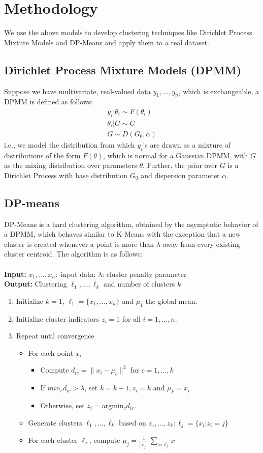 \documentclass{article} %
\begin{document}
\section{Methodology}
We use the above models to develop clustering techniques like Dirichlet Process Mixture Models and DP-Means and apply them to a real dataset.
\subsection{Dirichlet Process Mixture Models (DPMM)}
Suppose we have multivariate, real-valued data $y_1,...,y_n$, which is exchangeable, a DPMM is defined as follows:
\begin{eqnarray*}
y_i|\theta_i \sim F(\theta_i)\\
\theta_i|G \sim G\\
G \sim D(G_0, \alpha)
\end{eqnarray*}
i.e., we model the distribution from which $y_i$'s are drawn as a mixture of distributions of the form $F(\theta)$, which is normal for a Gaussian DPMM, with $G$ as the mixing distribution over parameters $\theta$. Further, the prior over $G$ is a Dirichlet Process with base distribution $G_0$ and dispersion parameter $\alpha$.

\subsection{DP-means}
DP-Means is a hard clustering algorithm, obtained by the asymptotic behavior of a DPMM, which behaves similar to K-Means with the exception that a new cluster is created whenever a point is more than $\lambda$ away from every existing cluster centroid. The algorithm is as follows:\\
\\
\textbf{Input:} $x_1,...,x_n:$ input data; $\lambda$: cluster penalty parameter\\
\textbf{Output:} Clustering $\ell_1,..., \ell_k$ and number of clusters $k$\\
\begin{enumerate}
\item Initialize $k=1$, $\ell_1=\{x_1,...,x_n\}$ and $\mu_1$ the global mean.
\item Initialize cluster indicators $z_i =1 $ for all $i=1,...,n.$
\item Repeat until convergence
\begin{itemize}
\item For each point $x_i$
\begin{itemize}
\item Compute $d_{ic}= \|x_i-\mu_c\|^2$ for $c = 1,...,k$
\item If $min_c d_{ic} >\lambda$, set $k = k+1, z_i =k$ and $\mu_k = x_i$
\item Otherwise, set $z_i=$argmin$_c d_{ic}$.
\end{itemize}
\item Generate clusters $\ell_1,..., \ell_k$ based on $z_1,...,z_k: \ell_j = \{x_i|z_i =j\}$
\item For each cluster $\ell_j$, compute $\mu_j = \frac{1}{|\ell_j|}\sum_{x\epsilon\ell_j}x$
\end{itemize}
\end{enumerate}
\end{document}
